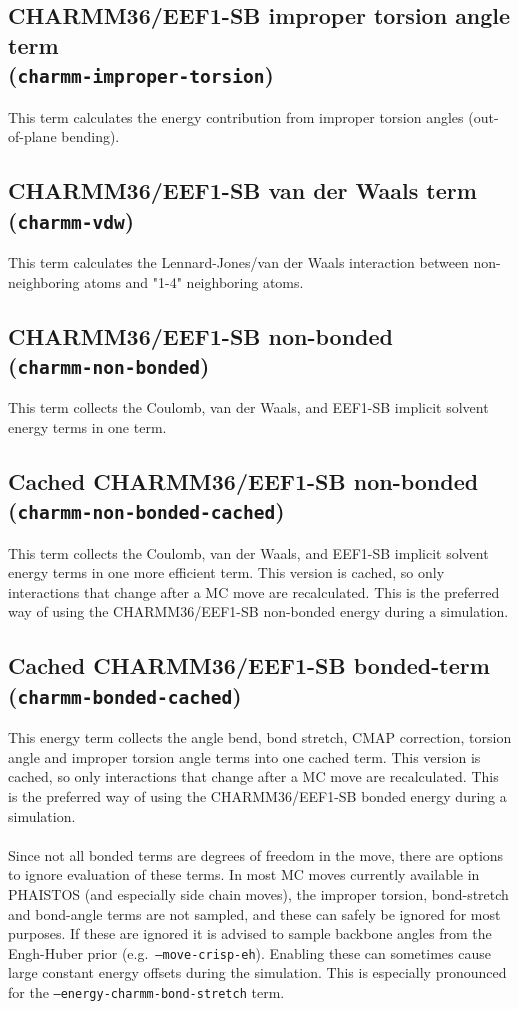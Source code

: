 \subsection{CHARMM36/EEF1-SB improper torsion angle term\\(\texttt{charmm-improper-torsion})}
This term calculates the energy contribution from improper torsion angles (out-of-plane bending).


\subsection{CHARMM36/EEF1-SB van der Waals term\\(\texttt{charmm-vdw})}
This term calculates the Lennard-Jones/van der Waals interaction between non-neighboring atoms and "1-4" neighboring atoms. 


\subsection{CHARMM36/EEF1-SB non-bonded\\(\texttt{charmm-non-bonded})}
This term collects the Coulomb, van der Waals, and EEF1-SB implicit solvent energy terms in one term.

\subsection{Cached CHARMM36/EEF1-SB non-bonded\\(\texttt{charmm-non-bonded-cached})}
This term collects the Coulomb, van der Waals, and EEF1-SB implicit solvent energy terms in one more efficient term.
This version is cached, so only interactions that change after a MC move are recalculated.
This is the preferred way of using the CHARMM36/EEF1-SB non-bonded energy during a simulation.

\subsection{Cached CHARMM36/EEF1-SB bonded-term\\(\texttt{charmm-bonded-cached})}

This energy term collects the angle bend, bond stretch, CMAP correction, torsion angle and improper torsion angle terms into one cached term.
This version is cached, so only interactions that change after a MC move are recalculated.
This is the preferred way of using the CHARMM36/EEF1-SB bonded energy during a simulation.
\\\\Since not all bonded terms are degrees of freedom in the move, there are options to ignore evaluation of these terms.
In most MC moves currently available in PHAISTOS (and especially side chain moves), the improper torsion, bond-stretch and bond-angle terms are not sampled, and these can safely be ignored for most purposes.
If these are ignored it is advised to sample backbone angles from the Engh-Huber prior (e.g.~\texttt{--move-crisp-eh}).
Enabling these can sometimes cause large constant energy offsets during the simulation.
This is especially pronounced for the \texttt{--energy-charmm-bond-stretch} term.

